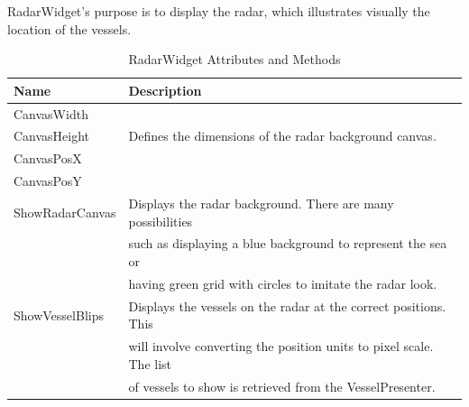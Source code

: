 \documentclass[12pt]{article}
\begin{document}
\vspace*{0.2in}
\vspace*{0.15in}
RadarWidget’s purpose is to display the radar, which illustrates visually the location of the vessels.
\begin{table}[ht]
\centering
   \begin{tabular}{|l|l|}
        \hline
        {\large Name} & {\large Description} \\
        \hline\hline
        CanvasWidth &  \\
        CanvasHeight & Defines the dimensions of the radar background canvas.\\
        CanvasPosX &  \\
        CanvasPosY &  \\
        \hline
        ShowRadarCanvas & Displays the radar background. There are many possibilities\\
         & such as displaying a blue background to represent the sea or\\
         & having green grid with circles to imitate the radar look.\\
        \hline
        ShowVesselBlips & Displays the vessels on the radar at the correct positions. This\\
         & will involve converting the position units to pixel scale. The list\\
         & of vessels to show is retrieved from the VesselPresenter.\\
        \hline
    \end{tabular}
\caption{RadarWidget Attributes and Methods}
\end{table}
\end{document}
